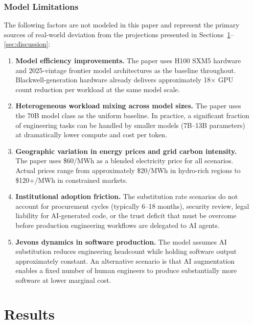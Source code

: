 \documentclass{article}
\begin{document}
\subsubsection{Model Limitations}

The following factors are not modeled in this paper and represent the primary sources of
real-world deviation from the projections presented in
Sections~\ref{sec:results}--\ref{sec:discussion}:

\begin{enumerate}
  \item \textbf{Model efficiency improvements.} The paper uses H100 SXM5 hardware and
    2025-vintage frontier model architectures as the baseline throughout. Blackwell-generation
    hardware already delivers approximately 18$\times$ GPU count reduction per workload at
    the same model scale.
  \item \textbf{Heterogeneous workload mixing across model sizes.} The paper uses the 70B
    model class as the uniform baseline. In practice, a significant fraction of engineering
    tasks can be handled by smaller models (7B--13B parameters) at dramatically lower compute
    and cost per token.
  \item \textbf{Geographic variation in energy prices and grid carbon intensity.} The paper
    uses \$60/MWh as a blended electricity price for all scenarios. Actual prices range from
    approximately \$20/MWh in hydro-rich regions to \$120+/MWh in constrained markets.
  \item \textbf{Institutional adoption friction.} The substitution rate scenarios do not
    account for procurement cycles (typically 6--18 months), security review, legal
    liability for AI-generated code, or the trust deficit that must be overcome before
    production engineering workflows are delegated to AI agents.
  \item \textbf{Jevons dynamics in software production.} The model assumes AI substitution
    reduces engineering headcount while holding software output approximately constant. An
    alternative scenario is that AI augmentation enables a fixed number of human engineers
    to produce substantially more software at lower marginal cost.
\end{enumerate}

\section{Results}
\label{sec:results}
\end{document}
